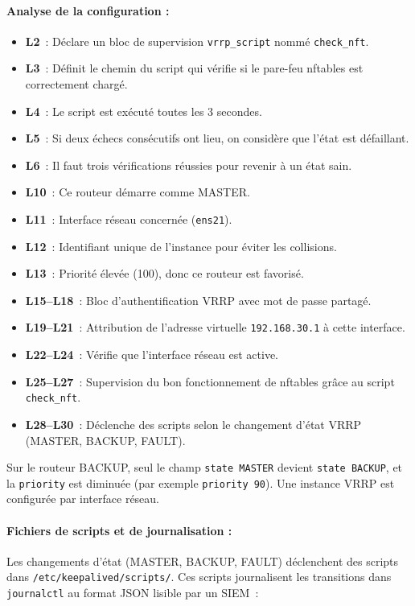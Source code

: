 \documentclass{article}
\begin{document}
\paragraph{Analyse de la configuration :}
\begin{itemize}
  \item \textbf{L2}~: Déclare un bloc de supervision \texttt{vrrp\_script} nommé \texttt{check\_nft}.
  \item \textbf{L3}~: Définit le chemin du script qui vérifie si le pare-feu nftables est correctement chargé.
  \item \textbf{L4}~: Le script est exécuté toutes les 3 secondes.
  \item \textbf{L5}~: Si deux échecs consécutifs ont lieu, on considère que l’état est défaillant.
  \item \textbf{L6}~: Il faut trois vérifications réussies pour revenir à un état sain.
  \item \textbf{L10}~: Ce routeur démarre comme MASTER.
  \item \textbf{L11}~: Interface réseau concernée (\texttt{ens21}).
  \item \textbf{L12}~: Identifiant unique de l’instance pour éviter les collisions.
  \item \textbf{L13}~: Priorité élevée (100), donc ce routeur est favorisé.
  \item \textbf{L15--L18}~: Bloc d’authentification VRRP avec mot de passe partagé.
  \item \textbf{L19--L21}~: Attribution de l’adresse virtuelle \texttt{192.168.30.1} à cette interface.
  \item \textbf{L22--L24}~: Vérifie que l’interface réseau est active.
  \item \textbf{L25--L27}~: Supervision du bon fonctionnement de nftables grâce au script \texttt{check\_nft}.
  \item \textbf{L28--L30}~: Déclenche des scripts selon le changement d’état VRRP (MASTER, BACKUP, FAULT).
\end{itemize}

Sur le routeur BACKUP, seul le champ \texttt{state MASTER} devient \texttt{state BACKUP}, et la \texttt{priority} est diminuée (par exemple \texttt{priority 90}). Une instance VRRP est configurée par interface réseau.

\paragraph{Fichiers de scripts et de journalisation :}
Les changements d'état (MASTER, BACKUP, FAULT) déclenchent des scripts dans \texttt{/etc/keepalived/scripts/}. Ces scripts journalisent les transitions dans \texttt{journalctl} au format JSON lisible par un SIEM~:
\end{document}
